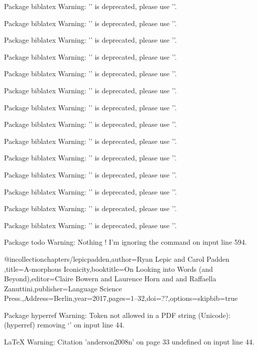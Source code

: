 Package biblatex Warning: '\printdatelabel' is deprecated, please use '\printlabeldate'.


Package biblatex Warning: '\printdatelabel' is deprecated, please use '\printlabeldate'.


Package biblatex Warning: '\printdatelabel' is deprecated, please use '\printlabeldate'.


Package biblatex Warning: '\printdatelabel' is deprecated, please use '\printlabeldate'.


Package biblatex Warning: '\printdatelabel' is deprecated, please use '\printlabeldate'.


Package biblatex Warning: '\printdatelabel' is deprecated, please use '\printlabeldate'.


Package biblatex Warning: '\printdatelabel' is deprecated, please use '\printlabeldate'.


Package biblatex Warning: '\printdatelabel' is deprecated, please use '\printlabeldate'.


Package biblatex Warning: '\printdatelabel' is deprecated, please use '\printlabeldate'.


Package biblatex Warning: '\printdatelabel' is deprecated, please use '\printlabeldate'.


Package biblatex Warning: '\printdatelabel' is deprecated, please use '\printlabeldate'.


Package biblatex Warning: '\printdatelabel' is deprecated, please use '\printlabeldate'.


Package biblatex Warning: '\printdatelabel' is deprecated, please use '\printlabeldate'.


Package biblatex Warning: '\printdatelabel' is deprecated, please use '\printlabeldate'.


Package todo Warning: Nothing \todo! I'm ignoring the \todos command on input line 594.

@incollection{chapters/lepicpadden,author={Ryan Lepic and  Carol Padden },title={{A-morphous Iconicity}},booktitle={{On Looking into Words (and Beyond)}},editor={Claire Bowern and  Laurence Horn and  and Raffaella Zanuttini},publisher={Language Science Press.},Address={Berlin},year=2017,pages={1--32},doi={??},options={skipbib=true}}

Package hyperref Warning: Token not allowed in a PDF string (Unicode):
(hyperref)                removing `\newline' on input line 44.


LaTeX Warning: Citation 'anderson2008n' on page 33 undefined on input line 44.


